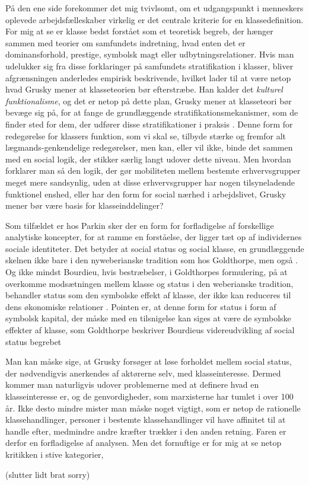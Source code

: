 På den ene side forekommer det mig tvivlsomt, om et udgangspunkt i menneskers oplevede arbejdsfælleskaber virkelig er det centrale kriterie for en klassedefinition. For mig at se er klasse bedst forstået som et teoretisk begreb, der hænger sammen med teorier om samfundets indretning, hvad enten det er dominansforhold, prestige, symbolsk magt eller udbytningsrelationer. Hvis man udelukker sig fra disse forklaringer på samfundets stratifikation i klasser, bliver afgrænsningen anderledes empirisk beskrivende, hvilket lader til at være netop hvad Grusky mener at klasseteorien bør efterstræbe. Han kalder det \emph{kulturel funktionalisme}, og det er netop på dette plan, Grusky mener at klasseteori bør bevæge sig på, for at fange de grundlæggende stratifikationsmekanismer, som de finder sted for dem, der udfører disse stratifikationer i praksis \parencite[229]{Grusky2002}. Denne form for redegørelse for klassers funktion, som vi skal se, tilbyde stærke og fremfor alt lægmands-genkendelige redegørelser, men kan, eller vil ikke, binde det sammen med en social logik, der stikker særlig langt udover dette niveau. Men hvordan forklarer man så den logik, der gør mobiliteten mellem bestemte erhvervsgrupper meget mere sandsynlig, uden at disse erhvervsgrupper har nogen tilsyneladende funktionel enshed, eller har den form for social nærhed i arbejdslivet, Grusky mener bør være basis for klasseinddelinger? 

Som tilfældet er hos Parkin sker der en form for forfladigelse af forskellige analytiske koncepter, for at ramme en forståelse, der ligger tæt op af individernes sociale identiteter. Det betyder at social status og social klasse, en grundlæggende skelnen ikke bare i den nyweberianske tradition som hos Goldthorpe, men også \textcite{Scott2002}. Og ikke mindst Bourdieu, hvis bestræbelser, i Goldthorpes formulering, på at overkomme modsætningen mellem klasse og status i den weberianske tradition, behandler status som den symbolske effekt af klasse, der ikke kan reduceres til dens økonomiske relationer \parencite[513]{Goldthorpe2007b}. Pointen er, at denne form for status i form af symbolsk kapital, der måske med en tilsnigelse kan siges at være de symbolske effekter af klasse, som Goldthorpe beskriver Bourdieus videreudvikling af social status begrebet \parencite[Goldthorpe2007b]{513}

Man kan måske sige, at Grusky forsøger at løse forholdet mellem social status, der nødvendigvis anerkendes af aktørerne selv, med klasseinteresse. Dermed kommer man naturligvis udover problemerne med at definere hvad en klasseinteresse er, og de genvordigheder, som marxisterne har tumlet i over 100 år. Ikke desto mindre mister man måske noget vigtigt, som er netop de rationelle klassehandlinger, personer i bestemte klassehandlinger vil have affinitet til at handle efter, medmindre andre kræfter trækker i den anden retning. Faren er derfor en forfladigelse af analysen. Men det fornuftige er for mig at se netop kritikken i stive kategorier,

(slutter lidt brat sorry)